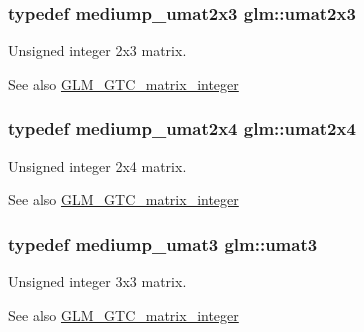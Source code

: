 \subsubsection[{umat2x3}]{\setlength{\rightskip}{0pt plus 5cm}typedef mediump\+\_\+umat2x3 {\bf glm\+::umat2x3}}\label{group__gtc__matrix__integer_ga890ae28f9230794138b2c89f44ce3376}
Unsigned integer 2x3 matrix. \begin{DoxySeeAlso}{See also}
\hyperlink{group__gtc__matrix__integer}{G\+L\+M\+\_\+\+G\+T\+C\+\_\+matrix\+\_\+integer} 
\end{DoxySeeAlso}
\hypertarget{group__gtc__matrix__integer_ga3b23b164240cf4dfb429776da7be9d88}{}
\subsubsection[{umat2x4}]{\setlength{\rightskip}{0pt plus 5cm}typedef mediump\+\_\+umat2x4 {\bf glm\+::umat2x4}}\label{group__gtc__matrix__integer_ga3b23b164240cf4dfb429776da7be9d88}
Unsigned integer 2x4 matrix. \begin{DoxySeeAlso}{See also}
\hyperlink{group__gtc__matrix__integer}{G\+L\+M\+\_\+\+G\+T\+C\+\_\+matrix\+\_\+integer} 
\end{DoxySeeAlso}
\hypertarget{group__gtc__matrix__integer_ga8b8fbc858e28abf8fc344744f8d6d368}{}
\subsubsection[{umat3}]{\setlength{\rightskip}{0pt plus 5cm}typedef mediump\+\_\+umat3 {\bf glm\+::umat3}}\label{group__gtc__matrix__integer_ga8b8fbc858e28abf8fc344744f8d6d368}
Unsigned integer 3x3 matrix. \begin{DoxySeeAlso}{See also}
\hyperlink{group__gtc__matrix__integer}{G\+L\+M\+\_\+\+G\+T\+C\+\_\+matrix\+\_\+integer} 
\end{DoxySeeAlso}
\hypertarget{group__gtc__matrix__integer_ga257300f2710612877ef45438a366e308}{}

